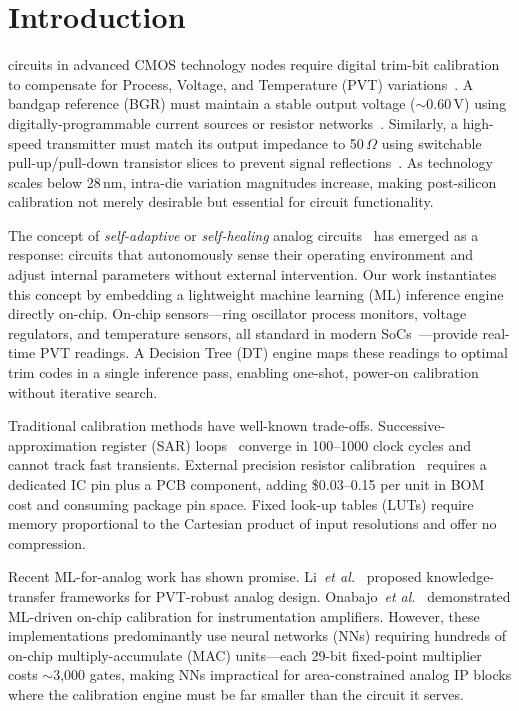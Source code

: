 \documentclass[lettersize,journal]{IEEEtran}
\begin{document}
\section{Introduction}
 circuits in advanced CMOS technology nodes require digital trim-bit calibration to compensate for Process, Voltage, and Temperature (PVT) variations~\cite{pvt_bowman}. A bandgap reference (BGR) must maintain a stable output voltage ($\sim$0.60\,V) using digitally-programmable current sources or resistor networks~\cite{bgr_leung}. Similarly, a high-speed transmitter must match its output impedance to 50\,$\Omega$ using switchable pull-up/pull-down transistor slices to prevent signal reflections~\cite{imp_kim}. As technology scales below 28\,nm, intra-die variation magnitudes increase, making post-silicon calibration not merely desirable but essential for circuit functionality.

The concept of \textit{self-adaptive} or \textit{self-healing} analog circuits~\cite{self_heal_liu} has emerged as a response: circuits that autonomously sense their operating environment and adjust internal parameters without external intervention. Our work instantiates this concept by embedding a lightweight machine learning (ML) inference engine directly on-chip. On-chip sensors---ring oscillator process monitors, voltage regulators, and temperature sensors, all standard in modern SoCs~\cite{pvt_bowman}---provide real-time PVT readings. A Decision Tree (DT) engine maps these readings to optimal trim codes in a single inference pass, enabling one-shot, power-on calibration without iterative search.

Traditional calibration methods have well-known trade-offs. Successive-approximation register (SAR) loops~\cite{sar_gondi} converge in 100--1000 clock cycles and cannot track fast transients. External precision resistor calibration~\cite{imp_kim} requires a dedicated IC pin plus a PCB component, adding \$0.03--0.15 per unit in BOM cost and consuming package pin space. Fixed look-up tables (LUTs) require memory proportional to the Cartesian product of input resolutions and offer no compression.

Recent ML-for-analog work has shown promise. Li~\textit{et al.}~\cite{ml_kt_li} proposed knowledge-transfer frameworks for PVT-robust analog design. Onabajo~\textit{et al.}~\cite{ml_onabajo} demonstrated ML-driven on-chip calibration for instrumentation amplifiers. However, these implementations predominantly use neural networks (NNs) requiring hundreds of on-chip multiply-accumulate (MAC) units---each 29-bit fixed-point multiplier costs $\sim$3,000 gates, making NNs impractical for area-constrained analog IP blocks where the calibration engine must be far smaller than the circuit it serves.
\end{document}

